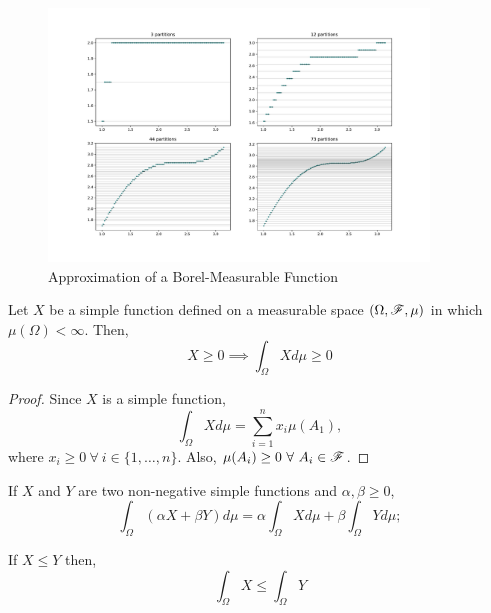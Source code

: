 \documentclass[../TGMAFFIRO.tex]{subfiles}
\begin{document}
\begin{figure}[h]
	\centering
	\label{fig:simple_approx_sine}
	\includegraphics[width=0.9\textwidth]{images/simple_sine.pdf}	
	\caption{Approximation of a Borel-Measurable Function}
\end{figure}

\begin{proposition} \label{prop:nnlmsf}
	Let $X$ be a simple function defined on a measurable space $(\Omega, \mathscr{F}, \mu)$ in which $\mu(\Omega) < \infty$. Then,
	\begin{equation}
		X \geq 0 \implies \int_\Omega X d\mu \geq 0
	\end{equation}
\end{proposition}

\begin{proof}
	Since $X$ is a simple function,
	\[
	\int_\Omega X d\mu = \sum_{i=1}^n x_i \mu(A_1),
	\]
	where $x_i \geq 0 \ \forall \ i \in \{1, \ldots, n\}$. Also, $\mu(A_i) \geq 0 \ \forall \ A_i \in \mathscr{F}$.
\end{proof}

\begin{theorem}
	If $X$ and $Y$ are two non-negative simple functions and $\alpha, \beta \geq 0$,
	\begin{equation}
		\int_\Omega (\alpha X + \beta Y) d\mu = \alpha\int_\Omega X d\mu + \beta\int_\Omega Y d\mu;
	\end{equation}
	
	If $X \leq Y$ then,
	\begin{equation}
		\int_\Omega X \leq \int_\Omega Y
	\end{equation} 
\end{theorem}
\end{document}
